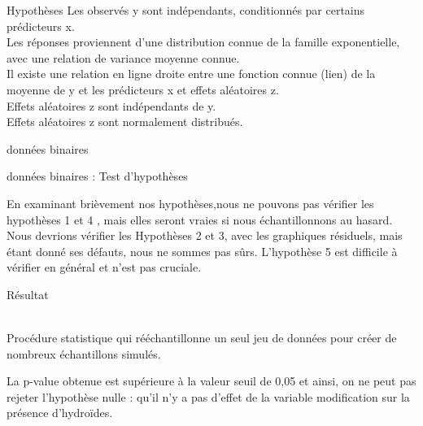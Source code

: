 \documentclass[unknownkeysallowed]{beamer}
\begin{document}
\begin{frame}{Hypothèses}
 Les observés y sont indépendants, conditionnés par certains prédicteurs x.\\
 Les réponses proviennent d'une distribution connue de la famille exponentielle, avec une relation de variance moyenne connue.\\
  Il existe une relation en ligne droite entre une fonction connue (lien) de la moyenne de y et les prédicteurs x et effets aléatoires z.\\
  Effets aléatoires z sont indépendants de y.\\
  Effets aléatoires z sont normalement distribués.\\
\end{frame}
\begin{frame}{données binaires}





\end{frame}


\begin{frame}{données binaires : Test d'hypothèses}

En examinant brièvement nos hypothèses,nous ne pouvons pas vérifier les hypothèses 1 et 4 , mais elles seront vraies si nous échantillonnons au hasard. Nous devrions vérifier les Hypothèses 2 et 3,  avec les graphiques résiduels, mais étant donné ses défauts, nous ne sommes pas sûrs. L'hypothèse 5 est difficile à vérifier en général et n'est pas cruciale.


\end{frame}


\begin{frame}{Résultat}
    
 \\
 Procédure statistique qui rééchantillonne un seul jeu de données pour créer de nombreux échantillons simulés. 
    
    
La p-value obtenue est supérieure à la valeur seuil de 0,05 et ainsi, on ne peut pas rejeter l'hypothèse nulle : qu'il n'y a pas d'effet de la variable modification sur la présence d'hydroïdes.
    

\end{frame}
\end{document}
